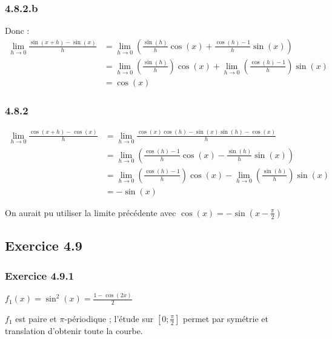 \documentclass[a4paper,10pt]{report}
\begin{document}
\subsubsection*{4.8.2.b}
Donc :
\begin{equation*}
	\begin{split}
	\lim_{h \rightarrow 0} \frac{\sin(x+h) - \sin(x)}{h}
		&= \lim_{h \rightarrow 0} \left( \frac{\sin(h)}{h}\cos(x) + \frac{\cos(h) - 1}{h}\sin(x) \right) \\
		&= \lim_{h \rightarrow 0} \left( \frac{\sin(h)}{h} \right) \cos(x) + \lim_{h \rightarrow 0} \left( \frac{\cos(h) - 1}{h}\right) \sin(x)\\
		&= \cos(x)
	\end{split}
\end{equation*}

\subsubsection*{4.8.2}
\begin{equation*}
	\begin{split}
		\lim_{h \rightarrow 0} \frac{\cos(x+h) - \cos(x)}{h}
		&= \lim_{h \rightarrow 0} \frac{\cos(x)\cos(h) - \sin(x)\sin(h)-\cos(x)}{h} \\
		&= \lim_{h \rightarrow 0} \left( \frac{\cos(h)-1}{h}\cos(x) - \frac{\sin(h)}{h}\sin(x) \right) \\
		&= \lim_{h \rightarrow 0} \left( \frac{\cos(h) - 1}{h}\right) \cos(x) - \lim_{h \rightarrow 0} \left( \frac{\sin(h)}{h} \right)   \sin(x) \\
		&= -\sin(x)
	\end{split}
\end{equation*}

On aurait pu utiliser la limite précédente avec $\cos(x) = -\sin(x-\frac{\pi}{2})$

\subsection*{Exercice 4.9}

\subsubsection*{Exercice 4.9.1}

$f_1(x) = \sin^2(x) = \frac{1 - \cos(2x)}{2}$

$f_1$ est paire et $\pi$-périodique ; l'étude sur $[0 ; \frac{\pi}{2}]$ permet par symétrie et translation
d'obtenir toute la courbe.
\end{document}
